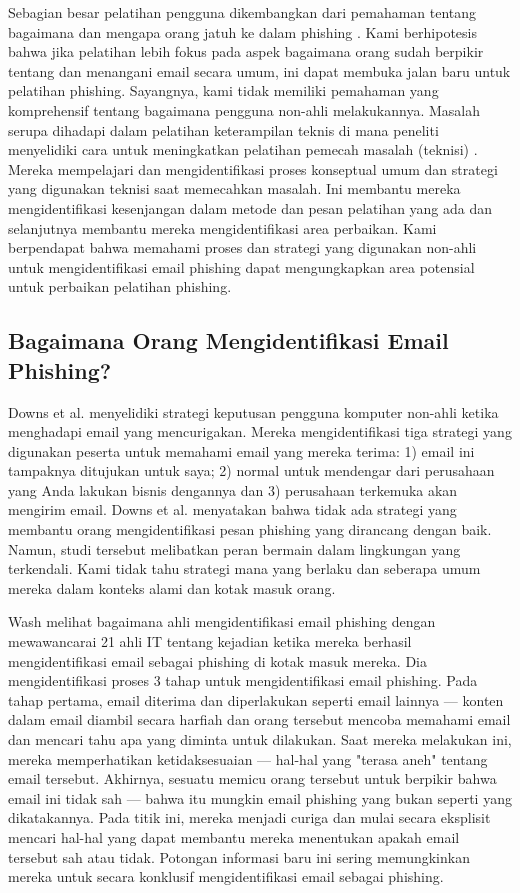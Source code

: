 \documentclass[lettersize,journal]{IEEEtran}
\begin{document}
Sebagian besar pelatihan pengguna dikembangkan dari pemahaman tentang bagaimana
dan mengapa orang jatuh ke dalam phishing \cite{enam}. Kami berhipotesis bahwa
jika pelatihan lebih fokus pada aspek bagaimana orang sudah berpikir tentang
dan menangani email secara umum, ini dapat membuka jalan baru untuk pelatihan
phishing. Sayangnya, kami tidak memiliki pemahaman yang komprehensif tentang
bagaimana pengguna non-ahli melakukannya. Masalah serupa dihadapi dalam
pelatihan keterampilan teknis di mana peneliti menyelidiki cara untuk
meningkatkan pelatihan pemecah masalah (teknisi) \cite{satulima}. Mereka
mempelajari dan mengidentifikasi proses konseptual umum dan strategi yang
digunakan teknisi saat memecahkan masalah. Ini membantu mereka mengidentifikasi
kesenjangan dalam metode dan pesan pelatihan yang ada dan selanjutnya membantu
mereka mengidentifikasi area perbaikan. Kami berpendapat bahwa memahami proses
dan strategi yang digunakan non-ahli untuk mengidentifikasi email phishing
dapat mengungkapkan area potensial untuk perbaikan pelatihan phishing.

\subsection{Bagaimana Orang Mengidentifikasi Email Phishing?}

Downs et al. \cite{tujuh} menyelidiki strategi keputusan pengguna komputer
non-ahli ketika menghadapi email yang mencurigakan. Mereka mengidentifikasi
tiga strategi yang digunakan peserta untuk memahami email yang mereka terima:
1) email ini tampaknya ditujukan untuk saya; 2) normal untuk mendengar dari
perusahaan yang Anda lakukan bisnis dengannya dan 3) perusahaan terkemuka akan
mengirim email. Downs et al. \cite{tujuh} menyatakan bahwa tidak ada strategi
yang membantu orang mengidentifikasi pesan phishing yang dirancang dengan baik.
Namun, studi tersebut melibatkan peran bermain dalam lingkungan yang
terkendali. Kami tidak tahu strategi mana yang berlaku dan seberapa umum mereka
dalam konteks alami dan kotak masuk orang.

Wash \cite{tigaempat} melihat bagaimana ahli mengidentifikasi email phishing
dengan mewawancarai 21 ahli IT tentang kejadian ketika mereka berhasil
mengidentifikasi email sebagai phishing di kotak masuk mereka. Dia
mengidentifikasi proses 3 tahap untuk mengidentifikasi email phishing. Pada
tahap pertama, email diterima dan diperlakukan seperti email lainnya — konten
dalam email diambil secara harfiah dan orang tersebut mencoba memahami email
dan mencari tahu apa yang diminta untuk dilakukan. Saat mereka melakukan ini,
mereka memperhatikan ketidaksesuaian — hal-hal yang "terasa aneh" tentang email
tersebut. Akhirnya, sesuatu memicu orang tersebut untuk berpikir bahwa email
ini tidak sah — bahwa itu mungkin email phishing yang bukan seperti yang
dikatakannya. Pada titik ini, mereka menjadi curiga dan mulai secara eksplisit
mencari hal-hal yang dapat membantu mereka menentukan apakah email tersebut sah
atau tidak. Potongan informasi baru ini sering memungkinkan mereka untuk secara
konklusif mengidentifikasi email sebagai phishing.
\end{document}
